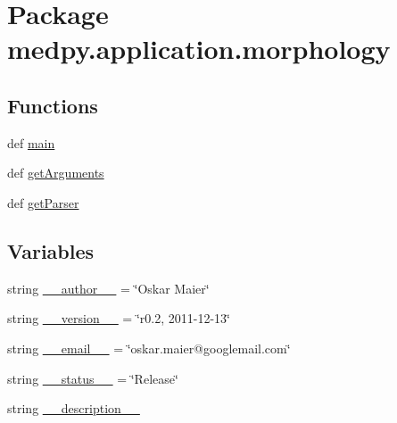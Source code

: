 \hypertarget{namespacemedpy_1_1application_1_1morphology}{
\section{Package medpy.application.morphology}
\label{namespacemedpy_1_1application_1_1morphology}
}
\subsection*{Functions}
\begin{DoxyCompactItemize}
\item 
def \hyperlink{namespacemedpy_1_1application_1_1morphology_a26a45255f938226ec4a72990af842c66}{main}
\item 
def \hyperlink{namespacemedpy_1_1application_1_1morphology_a1443bb369ede80d47c1c63b6fc95663e}{getArguments}
\item 
def \hyperlink{namespacemedpy_1_1application_1_1morphology_a7fcc09526e1f3c24682e158d1990be86}{getParser}
\end{DoxyCompactItemize}
\subsection*{Variables}
\begin{DoxyCompactItemize}
\item 
string \hyperlink{namespacemedpy_1_1application_1_1morphology_a944a307ced7f5defc3724c82427ea815}{\_\-\_\-author\_\-\_\-} = \char`\"{}Oskar Maier\char`\"{}
\item 
string \hyperlink{namespacemedpy_1_1application_1_1morphology_a6eefe963c863090b18c69108688aa9d2}{\_\-\_\-version\_\-\_\-} = \char`\"{}r0.2, 2011-\/12-\/13\char`\"{}
\item 
string \hyperlink{namespacemedpy_1_1application_1_1morphology_aafe8416d1b9746d52acfeb3cab3b02a9}{\_\-\_\-email\_\-\_\-} = \char`\"{}oskar.maier@googlemail.com\char`\"{}
\item 
string \hyperlink{namespacemedpy_1_1application_1_1morphology_abc62ace7fb94ffe1964b29874891ede1}{\_\-\_\-status\_\-\_\-} = \char`\"{}Release\char`\"{}
\item 
string \hyperlink{namespacemedpy_1_1application_1_1morphology_a9ff91e726f077b9edffd31ee7be7b841}{\_\-\_\-description\_\-\_\-}
\end{DoxyCompactItemize}


